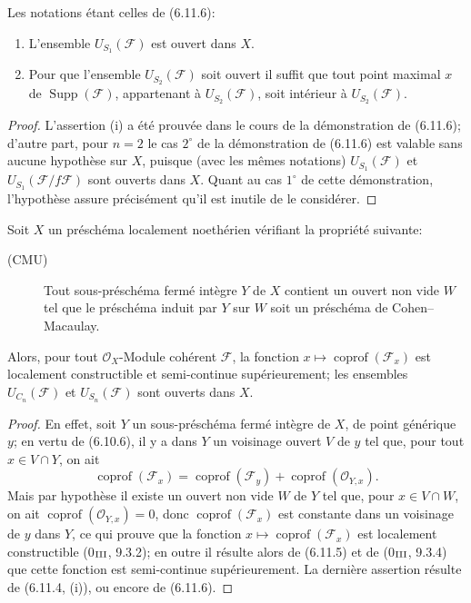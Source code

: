 \begin{corollary}[6.11.7]
\label{IV.2.s6.11.7-fr}
Les notations étant celles de (6.11.6):
\begin{enumerate}
\item[(i)] L'ensemble $U_{S_1}(\mathcal F)$ est ouvert dans $X$.
\item[(ii)] Pour que l'ensemble $U_{S_2}(\mathcal F)$ soit ouvert il suffit
que tout point maximal $x$ de $\operatorname{Supp}(\mathcal F)$,
appartenant à $U_{S_2}(\mathcal F)$, soit intérieur à
$U_{S_2}(\mathcal F)$.
\end{enumerate}
\end{corollary}

\begin{proof}
L'assertion (i) a été prouvée dans le cours de la démonstration de (6.11.6);
d'autre part, pour $n=2$ le cas $2^\circ$ de la démonstration de (6.11.6)
est valable sans aucune hypothèse sur $X$, puisque (avec les mêmes
notations) $U_{S_1}(\mathcal F)$ et
$U_{S_1}(\mathcal F/f\mathcal F)$ sont ouverts dans $X$. Quant au cas
$1^\circ$ de cette démonstration, l'hypothèse assure précisément qu'il est
inutile de le considérer.
\end{proof}


\begin{proposition}[6.11.8]
\label{IV.2.s6.11.8-fr}
Soit $X$ un préschéma localement noethérien vérifiant la propriété suivante:
\begin{description}
\item[(CMU)] Tout sous-préschéma fermé intègre $Y$ de $X$ contient un ouvert
non vide $W$ tel que le préschéma induit par $Y$ sur $W$ soit un préschéma
de Cohen--Macaulay.
\end{description}
Alors, pour tout $\mathcal O_X$-Module cohérent $\mathcal F$, la fonction
$x\mapsto\operatorname{coprof}(\mathcal F_x)$ est localement constructible
et semi-continue supérieurement; les ensembles $U_{C_n}(\mathcal F)$ et
$U_{S_n}(\mathcal F)$ sont ouverts dans $X$.
\end{proposition}

\begin{proof}
En effet, soit $Y$ un sous-préschéma fermé intègre de $X$, de point
générique $y$; en vertu de (6.10.6), il y a dans $Y$ un voisinage ouvert
$V$ de $y$ tel que, pour tout $x\in V\cap Y$, on ait
\begin{equation}
\operatorname{coprof}(\mathcal F_x)=
\operatorname{coprof}(\mathcal F_y)+
\operatorname{coprof}(\mathcal O_{Y,x}).
\tag{6.11.8.1}\label{IV.2.s6.11.8.1-fr}
\end{equation}
Mais par hypothèse il existe un ouvert non vide $W$ de $Y$ tel que, pour
$x\in V\cap W$, on ait $\operatorname{coprof}(\mathcal O_{Y,x})=0$, donc
$\operatorname{coprof}(\mathcal F_x)$ est constante dans un voisinage de
$y$ dans $Y$, ce qui prouve que la fonction
$x\mapsto\operatorname{coprof}(\mathcal F_x)$ est localement constructible
(0$_{\rm III}$, 9.3.2); en outre il résulte alors de (6.11.5) et de
(0$_{\rm III}$, 9.3.4) que cette fonction est semi-continue supérieurement.
La dernière assertion résulte de (6.11.4, (i)), ou encore de (6.11.6).
\end{proof}

